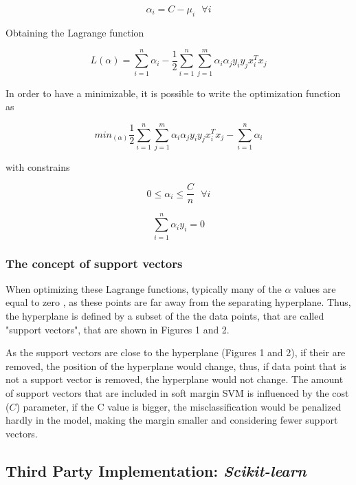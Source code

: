\documentclass[11pt,twocolumn,letterpaper]{article}
\begin{document}
\begin{equation}
	\alpha_i = C - \mu_i \:\:\: \forall i
\end{equation}


Obtaining the Lagrange function

\begin{equation}
	L(\alpha) = \sum_{i=1}^{n} \alpha_i - \frac{1}{2} \sum_{i=1}^{n} \sum_{j=1}^{m} \alpha_i \alpha_j y_i y_j x_i^T x_j
\end{equation}

In order to have a minimizable, it is possible to write the optimization function as

\begin{equation}
	min_{(\alpha)} \frac{1}{2} \sum_{i=1}^{n} \sum_{j=1}^{m} \alpha_i \alpha_j y_i y_j x_i^T x_j - \sum_{i=1}^{n} \alpha_i
\end{equation}

with constrains

\begin{equation}
	0 \leq \alpha_i \leq \frac{C}{n}   \:\:\: \forall i
\end{equation}

\begin{equation}
	\sum_{i=1}^{n} \alpha_i y_i = 0
\end{equation}

\subsubsection{The concept of support vectors}

When optimizing these Lagrange functions, typically many of the $\alpha$ values are equal to zero \cite{Hastie2009}, as these points are far away from the separating hyperplane. Thus, the hyperplane is defined by a subset of the the data points, that are called "support vectors", that are shown in Figures 1 and 2.

As the support vectors are close to the hyperplane (Figures 1 and 2), if their are removed, the position of the hyperplane would change, thus, if data point that is not a support vector is removed, the hyperplane would not change. The amount of support vectors that are included in soft margin SVM is influenced by the cost ($C$) parameter, if the C value is bigger, the misclassification would be penalized hardly in the model, making the margin smaller and considering fewer support vectors.

\subsection{Third Party Implementation: \textit{Scikit-learn}}
\end{document}
